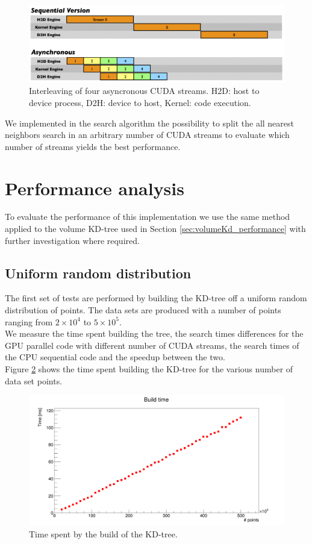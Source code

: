 \begin{figure}
\includegraphics[width=\textwidth]{fkdtree/cuda_streams.png}
\caption{Interleaving of four asyncronous CUDA streams. H2D: host to device process, D2H: device to host, Kernel: code execution.}
\label{cuda_streams}
\end{figure}

We implemented in the search algorithm the possibility to split the all nearest neighbors search in an arbitrary number of CUDA streams to evaluate which number of streams yields the best performance.\\

\section{Performance analysis}
To evaluate the performance of this implementation we use the same method applied to the volume KD-tree used in Section \ref{sec:volumeKd_performance} with further investigation where required.\\

\subsection{Uniform random distribution}
The first set of tests are performed by building the KD-tree off a uniform random distribution of points. The data sets are produced with a number of points ranging from $2 \times 10^4$ to $5 \times 10^5$.\\
We measure the time spent building the tree, the search times differences for the GPU parallel code with different number of CUDA streams, the search times of the CPU sequential code and the speedup between the two.\\
Figure \ref{fkdtree_build_times} shows the time spent building the KD-tree for the various number of data set points.\\

\begin{figure}
\includegraphics[width=\textwidth]{fkdtree/fkdBuildTimes.png}
\caption{Time spent by the build of the KD-tree.}
\label{fkdtree_build_times}
\end{figure}

